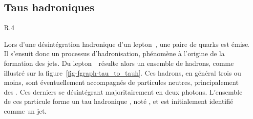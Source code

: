 \subsection{Taus hadroniques}\label{chapter-CMS-section-taus}

\begin{wrapfigure}{R}{.4\textwidth}
\centering

\vspace{\baselineskip}
\caption{Diagramme de Feynman de désintégration hadronique d'un \leptau.}
\label{fig-fgraph-tau_to_tauh}
\end{wrapfigure}
Lors d'une désintégration hadronique d'un lepton~\tau, une paire de quarks est émise.
Il s'ensuit donc un processus d'hadronisation, phénomène à l'origine de la formation des jets.
Du lepton~\tau\ résulte alors un ensemble de hadrons, comme illustré sur la figure~\ref{fig-fgraph-tau_to_tauh}.
Ces hadrons, en général trois ou moins, sont éventuellement accompagnés de particules neutres, principalement des \pionnull.
Ces derniers se désintégrant majoritairement en deux photons.
L'ensemble de ces particule forme un \og tau hadronique \fg, noté \tauh, et est initialement identifié comme un jet.
